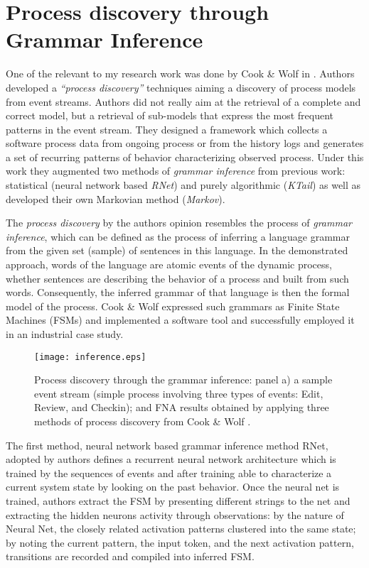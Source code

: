\section{Process discovery through Grammar Inference} \label{grammar}
One of the relevant to my research work was done by Cook \& Wolf in \cite{citeulike:328044}. Authors developed a \textit{``process discovery''} techniques aiming a discovery of process models from event streams. Authors did not really aim at the retrieval of a complete and correct model, but a retrieval of sub-models that express the most frequent patterns in the event stream. They designed a framework which collects a software process data from ongoing process or from the history logs and generates a set of recurring patterns of behavior characterizing observed process. Under this work they augmented two methods of \textit{grammar inference} from previous work: statistical (neural network based \textit{RNet}) and purely algorithmic (\textit{KTail}) as well as developed their own Markovian method (\textit{Markov}). 

The \textit{process discovery} by the authors opinion resembles the process of \textit{grammar inference}, which can be defined as the process of inferring a language grammar from the given set (sample) of sentences in this language. In the demonstrated approach, words of the language are atomic events of the dynamic process, whether sentences are describing the behavior of a process and built from such words. Consequently, the inferred grammar of that language is then the formal model of the process. Cook \& Wolf expressed such grammars as Finite State Machines (FSMs) and implemented a software tool and successfully employed it in an industrial case study.

\begin{figure}[tbp]
   \centering
   \texttt{[image: inference.eps]}
   \caption{Process discovery through the grammar inference: panel a) a sample event stream (simple process involving three types of events: Edit, Review, and Checkin); and FNA results obtained by applying three methods of process discovery from Cook \& Wolf \cite{citeulike:328044}.}
   \label{fig:inference}
\end{figure}

The first method, neural network based grammar inference method RNet, adopted by authors defines a recurrent neural network architecture which is trained by the sequences of events and after training able to characterize a current system state by looking on the past behavior. Once the neural net is trained, authors extract the FSM by presenting different strings to the net and extracting the hidden neurons activity through observations: by the nature of Neural Net, the closely related activation patterns clustered into the same state; by noting the current pattern, the input token, and the next activation pattern, transitions are recorded and compiled into inferred FSM.

